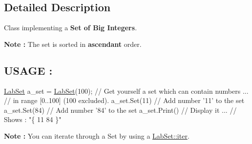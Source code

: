 \subsection{Detailed Description}
Class implementing a {\bfseries Set of Big Integers}.

{\bfseries Note \+:} The set is sorted in {\bfseries ascendant} order.

\subsection*{U\+S\+A\+G\+E \+: }


\begin{DoxyCode}
\hyperlink{classelps_1_1_lab_set_aea6526eace0dcc7acdd5805b0b4534f7}{LabSet} a\_set = \hyperlink{classelps_1_1_lab_set_aea6526eace0dcc7acdd5805b0b4534f7}{LabSet}(100);          \textcolor{comment}{// Get yourself a set which can contain numbers}
...                                  \textcolor{comment}{// in range [0..100] (100 excluded).}
a\_set.Set(11)                        \textcolor{comment}{// Add number '11' to the set}
a\_set.Set(84)                        \textcolor{comment}{// Add number '84' to the set}
a\_set.Print()                        \textcolor{comment}{// Display it}
...                                  \textcolor{comment}{// Shows : "\{ 11 84 \}"}
\end{DoxyCode}


{\bfseries Note \+:} You can iterate through a Set by using a \hyperlink{classelps_1_1_lab_set_1_1iter}{Lab\+Set\+::iter}. 

